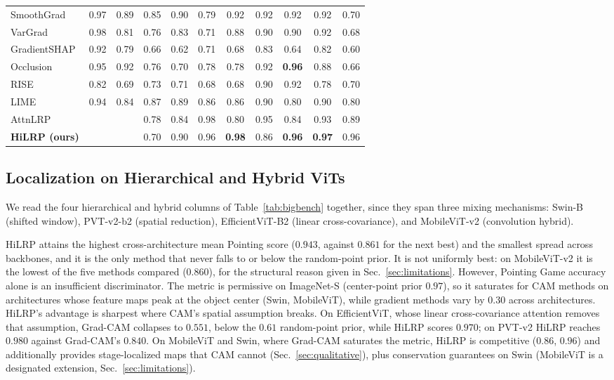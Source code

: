 \documentclass[lettersize,journal]{IEEEtran}
\theoremstyle{definition}
\theoremstyle{plain}
\newcommand{\nd}{\textemdash}            %
\begin{document}
\begin{table}[!tbp]
\begin{tabular}{@{}l cc cc cccccc@{}}
    SmoothGrad        & 0.97 & 0.89 & 0.85 & 0.90 & 0.79 & 0.92 & 0.92 & 0.92 & 0.92 & 0.70 \\
    VarGrad           & 0.98 & 0.81 & 0.76 & 0.83 & 0.71 & 0.88 & 0.90 & 0.90 & 0.92 & 0.68 \\
    GradientSHAP      & 0.92 & 0.79 & 0.66 & 0.62 & 0.71 & 0.68 & 0.83 & 0.64 & 0.82 & 0.60 \\
    Occlusion         & 0.95 & 0.92 & 0.76 & 0.70 & 0.78 & 0.78 & 0.92 & \textbf{0.96} & 0.88 & 0.66 \\
    RISE              & 0.82 & 0.69 & 0.73 & 0.71 & 0.68 & 0.68 & 0.90 & 0.92 & 0.78 & 0.70 \\
    LIME              & 0.94 & 0.84 & 0.87 & 0.89 & 0.86 & 0.86 & 0.90 & 0.80 & 0.90 & 0.80 \\
    AttnLRP           & \nd & \nd & 0.78 & 0.84 & 0.98 & 0.80 & 0.95 & 0.84 & 0.93 & 0.89 \\
    \midrule
    \textbf{HiLRP (ours)} & \nd & \nd & 0.70 & 0.90 & 0.96 & \textbf{0.98} & 0.86 & \textbf{0.96} & \textbf{0.97} & 0.96 \\
    \bottomrule
  \end{tabular}
\end{table}

\subsection{Localization on Hierarchical and Hybrid ViTs}
\label{sec:localization}
We read the four hierarchical and hybrid columns of Table~\ref{tab:bigbench} together, since they span three mixing mechanisms: Swin-B (shifted window), PVT-v2-b2 (spatial reduction), EfficientViT-B2 (linear cross-covariance), and MobileViT-v2 (convolution hybrid).

HiLRP attains the highest cross-architecture mean Pointing score ($0.943$, against $0.861$ for the next best) and the smallest spread across backbones, and it is the only method that never falls to or below the random-point prior. It is not uniformly best: on MobileViT-v2 it is the lowest of the five methods compared ($0.860$), for the structural reason given in Sec.~\ref{sec:limitations}. However, Pointing Game accuracy alone is an insufficient discriminator. The metric is permissive on ImageNet-S (center-point prior $0.97$), so it saturates for CAM methods on architectures whose feature maps peak at the object center (Swin, MobileViT), while gradient methods vary by $0.30$ across architectures. HiLRP's advantage is sharpest where CAM's spatial assumption breaks. On EfficientViT, whose linear cross-covariance attention removes that assumption, Grad-CAM collapses to $0.551$, below the $0.61$ random-point prior, while HiLRP scores $0.970$; on PVT-v2 HiLRP reaches $0.980$ against Grad-CAM's $0.840$. On MobileViT and Swin, where Grad-CAM saturates the metric, HiLRP is competitive ($0.86$, $0.96$) and additionally provides stage-localized maps that CAM cannot (Sec.~\ref{sec:qualitative}), plus conservation guarantees on Swin (MobileViT is a designated extension, Sec.~\ref{sec:limitations}).
\end{document}
